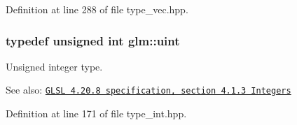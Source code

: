 Definition at line 288 of file type\_\-vec.hpp.\hypertarget{group__core__precision_g4fd29415871152bfb5abd588334147c8}{
\subsubsection[uint]{\setlength{\rightskip}{0pt plus 5cm}typedef unsigned int {\bf glm::uint}}}
\label{group__core__precision_g4fd29415871152bfb5abd588334147c8}


Unsigned integer type.

\begin{Desc}
\item[See also:]\href{http://www.opengl.org/registry/doc/GLSLangSpec.4.20.8.pdf}{\tt GLSL 4.20.8 specification, section 4.1.3 Integers} \end{Desc}


Definition at line 171 of file type\_\-int.hpp.